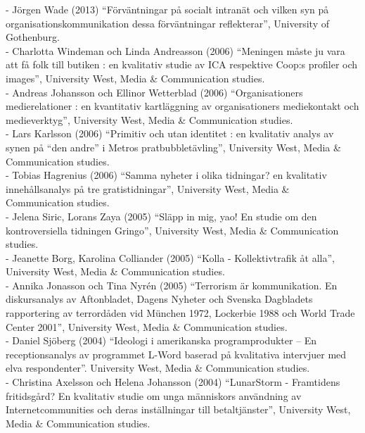 \documentclass[a4paper,11pt,oneside]{article}
\begin{document}
{             - Jörgen Wade (2013) ``Förväntningar på socialt intranät och vilken syn på organisationskommunikation dessa förväntningar reflekterar'', University of Gothenburg.\\
             - Charlotta Windeman och Linda Andreasson (2006) ``Meningen måste ju vara att få folk till butiken : en kvalitativ studie av ICA respektive Coop:s profiler och images'',	University West, Media \& Communication studies. \\
             - Andreas Johansson och Ellinor Wetterblad (2006) ``Organisationers medierelationer : en kvantitativ kartläggning av organisationers mediekontakt och medieverktyg'',	University West, Media \& Communication studies. \\
             - Lars Karlsson (2006) ``Primitiv och utan identitet : en kvalitativ analys av synen på ``den andre'' i Metros pratbubbletävling'',	University West, Media \& Communication studies. \\
             - Tobias Hagrenius (2006) ``Samma nyheter i olika tidningar? en kvalitativ innehållsanalys på tre gratistidningar'',	University West, Media \& Communication studies. \\
             - Jelena Siric, Lorans Zaya (2005) ``Släpp in mig, yao! En studie om den kontroversiella tidningen Gringo'', 	University West, Media \& Communication studies. \\
             - Jeanette Borg, Karolina Colliander (2005) ``Kolla - Kollektivtrafik åt alla'',	University West, Media \& Communication studies. \\
             - Annika Jonasson och Tina Nyrén (2005) ``Terrorism är kommunikation. En diskursanalys av Aftonbladet, Dagens Nyheter och Svenska Dagbladets rapportering av terrordåden vid München 1972, Lockerbie 1988 och World Trade Center 2001'', University West, Media \& Communication studies. \\
             - Daniel Sjöberg (2004) ``Ideologi i amerikanska programprodukter – En receptionsanalys av programmet L-Word baserad på kvalitativa intervjuer med elva respondenter''. University West, Media \& Communication studies. \\
             - Christina Axelsson och Helena Johansson (2004) ``LunarStorm - Framtidens fritidsgård? En kvalitativ studie om unga människors användning av Internetcommunities och deras inställningar till betaltjänster'', University West, Media \& Communication studies. \\

}
\end{document}
